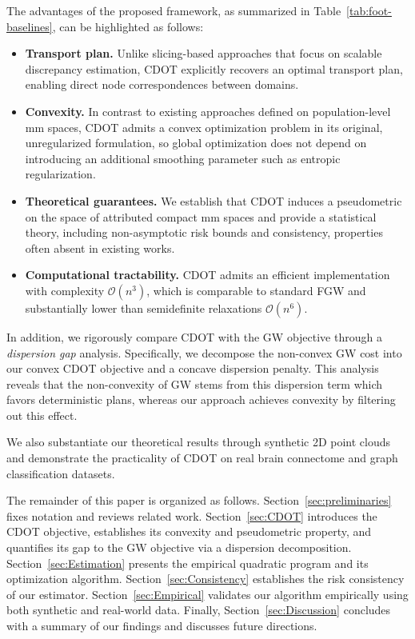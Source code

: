 \documentclass{article}
\theoremstyle{plain}
\theoremstyle{definition}
\theoremstyle{remark}
\begin{document}
The advantages of the proposed framework, as summarized in Table~\ref{tab:foot-baselines}, can be highlighted as follows: \vspace{-2mm}
\begin{itemize}
	\item \textbf{Transport plan.} 
	Unlike slicing-based approaches that focus on scalable discrepancy estimation, CDOT explicitly recovers an optimal transport plan, enabling direct node correspondences between domains. \vspace{-1mm}
	\item \textbf{Convexity.}
	In contrast to existing approaches defined on population-level mm spaces, CDOT admits a convex optimization problem in its original, unregularized formulation, so global optimization does not depend on introducing an additional smoothing parameter such as entropic regularization. \vspace{-1mm}
	\item \textbf{Theoretical guarantees.} 
	We establish that CDOT induces a pseudometric on the space of attributed compact mm spaces and provide a statistical theory, including non-asymptotic risk bounds and consistency, properties often absent in existing works. \vspace{-1mm}
	\item \textbf{Computational tractability.} 
	CDOT admits an efficient implementation with complexity $\mathcal{O}(n^3)$, which is comparable to standard FGW and substantially lower than semidefinite relaxations $\mathcal{O}(n^6)$.
\end{itemize}  \vspace{-2mm}

In addition, we rigorously compare CDOT with the GW objective through a \emph{dispersion gap} analysis. Specifically, we decompose the non-convex GW cost into our convex CDOT objective and a concave dispersion penalty. This analysis reveals that the non-convexity of GW stems from this dispersion term which favors deterministic plans, whereas our approach achieves convexity by filtering out this effect.

We also substantiate our theoretical results through synthetic 2D point clouds and demonstrate the practicality of CDOT on real brain connectome and graph classification datasets.

The remainder of this paper is organized as follows.
Section~\ref{sec:preliminaries} fixes notation and reviews related work.
Section~\ref{sec:CDOT} introduces the CDOT objective, establishes its convexity and pseudometric property, and quantifies its gap to the GW objective via a dispersion decomposition.
Section~\ref{sec:Estimation} presents the empirical quadratic program and its optimization algorithm.
Section~\ref{sec:Consistency} establishes the risk consistency of our estimator.
Section~\ref{sec:Empirical} validates our algorithm empirically using both synthetic and real-world data.
Finally, Section~\ref{sec:Discussion} concludes with a summary of our findings and discusses future directions.
\end{document}
